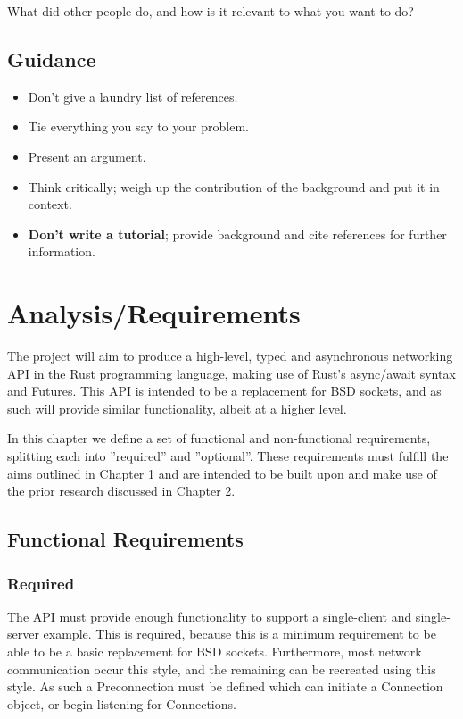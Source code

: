 \documentclass{l4proj}
\begin{document}
What did other people do, and how is it relevant to what you want to do?
\section{Guidance}
\begin{itemize}    
    \item
      Don't give a laundry list of references.
    \item
      Tie everything you say to your problem.
    \item
      Present an argument.
    \item Think critically; weigh up the contribution of the background and put it in context.    
    \item
      \textbf{Don't write a tutorial}; provide background and cite
      references for further information.
\end{itemize}

\chapter{Analysis/Requirements}
The project will aim to produce a high-level, typed and asynchronous networking API in the Rust programming language, making use of
Rust's async/await syntax and Futures.
This API is intended to be a replacement for BSD sockets, and as such will provide similar functionality, albeit at a higher level.

In this chapter we define a set of functional and non-functional requirements, splitting each into ''required'' and ''optional''.
These requirements must fulfill the aims outlined in Chapter 1 and are intended to be built upon and make use of the prior research
discussed in Chapter 2.

\section{Functional Requirements}

\subsection{Required}

The API must provide enough functionality to support a single-client and single-server example.
This is required, because this is a minimum requirement to be able to be a basic replacement for BSD sockets.
Furthermore, most network communication occur this style, and the remaining can be recreated using this style.
As such a Preconnection must be defined which can initiate a Connection object, or begin listening for Connections.
\end{document}
